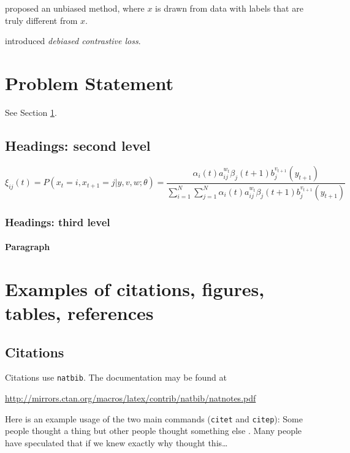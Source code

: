 \documentclass{article}
\begin{document}
\citep{chuang2021debiased} proposed an unbiased method, where $x$ is drawn from data with labels that are truly different from $x$.

\citep{chuang2021debiased} introduced \emph{debiased contrastive loss}.



\section{Problem Statement}
\label{sec:headings}

\lipsum[4] See Section \ref{sec:headings}.

\subsection{Headings: second level}
\lipsum[5]
\begin{equation}
	\xi _{ij}(t)=P(x_{t}=i,x_{t+1}=j|y,v,w;\theta)= {\frac {\alpha _{i}(t)a^{w_t}_{ij}\beta _{j}(t+1)b^{v_{t+1}}_{j}(y_{t+1})}{\sum _{i=1}^{N} \sum _{j=1}^{N} \alpha _{i}(t)a^{w_t}_{ij}\beta _{j}(t+1)b^{v_{t+1}}_{j}(y_{t+1})}}
\end{equation}

\subsubsection{Headings: third level}
\lipsum[6]

\paragraph{Paragraph}
\lipsum[7]



\section{Examples of citations, figures, tables, references}
\label{sec:others}

\subsection{Citations}
Citations use \verb+natbib+. The documentation may be found at
\begin{center}
	\url{http://mirrors.ctan.org/macros/latex/contrib/natbib/natnotes.pdf}
\end{center}

Here is an example usage of the two main commands (\verb+citet+ and \verb+citep+): Some people thought a thing \citep{kour2014real, hadash2018estimate} but other people thought something else \citep{kour2014fast}. Many people have speculated that if we knew exactly why \citet{kour2014fast} thought this\dots
\end{document}
